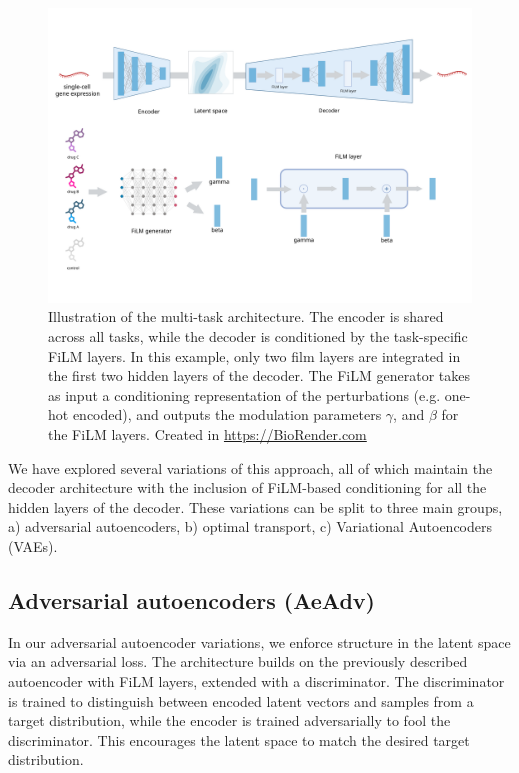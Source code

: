 \documentclass[12pt, a4paper]{article}
\begin{document}
\begin{figure}
    \centering
    \includegraphics[width=\textwidth]{biorender_film_architecture.png}
    \caption{Illustration of the multi-task architecture. The encoder is shared across all tasks, while the decoder is conditioned by the task-specific FiLM layers. In this example, only two film layers are integrated in the first two hidden layers of the decoder. The FiLM generator takes as input a conditioning representation of the perturbations (e.g. one-hot encoded), and outputs the modulation parameters $\gamma$, and $\beta$ for the FiLM layers. Created in  \url{https://BioRender.com}}
\end{figure}


We have explored several variations of this approach, all of which maintain the decoder architecture with the inclusion of FiLM-based conditioning for all the hidden layers of the decoder. These variations can be split to three main groups, a) adversarial autoencoders, b) optimal transport, c) Variational Autoencoders (VAEs).

\subsection{Adversarial autoencoders (AeAdv)}

In our adversarial autoencoder variations, we enforce structure in the latent space via an adversarial loss. The architecture builds on the previously described autoencoder with FiLM layers, extended with a discriminator. The discriminator is trained to distinguish between encoded latent vectors and samples from a target distribution, while the encoder is trained adversarially to fool the discriminator. This encourages the latent space to match the desired target distribution.
\end{document}
